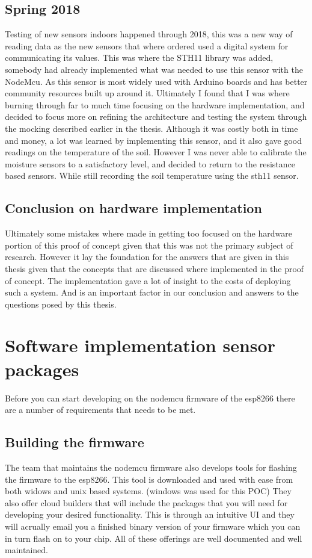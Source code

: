 \documentclass[]{uiophd}
\begin{document}
\subsection{Spring 2018}
Testing of new sensors indoors happened through 2018, this was a new way of reading data as the new sensors that where ordered used a digital system for communicating its values. This was where the STH11 library was added, somebody had already implemented what was needed to use this sensor with the NodeMcu. As this sensor is most widely used with Arduino boards and has better community resources built up around it. Ultimately I found that I was where burning through far to much time focusing on the hardware implementation, and decided to focus more on refining the architecture and testing the system through the mocking described earlier in the thesis. Although it was costly both in time and money, a lot was learned by implementing this sensor, and it also gave good readings on the temperature of the soil. However I was never able to calibrate the moisture sensors to a satisfactory level, and decided to return to the resistance based sensors. While still recording the soil temperature using the sth11 sensor. 
\subsection{Conclusion on hardware implementation}
Ultimately some mistakes where made in getting too focused on the hardware portion of this proof of concept given that this was not the primary subject of research. However it lay the foundation for the answers that are given in this thesis given that the concepts that are discussed where implemented in the proof of concept. The implementation gave a lot of insight to the costs of deploying such a system. And is an important factor in our conclusion and answers to the questions posed by this thesis.
\section{Software implementation sensor packages}
Before you can start developing on the nodemcu firmware of the esp8266 there are a number of requirements that needs to be met.
\subsection{Building the firmware}
The team that maintains the nodemcu firmware also develops tools for flashing the firmware to the esp8266. This tool is downloaded and used with ease from both widows and unix based systems. (windows was used for this POC) They also offer cloud builders that will include the packages that you will need for developing your desired functionality. This is through an intuitive UI and they will acrually email you a finished binary version of your firmware which you can in turn flash on to your chip. All of these offerings are well documented and well maintained.
\end{document}
